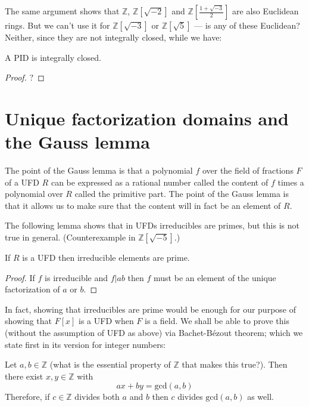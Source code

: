 \noindent
The same argument shows that
$\mathbb{Z}$,
$\mathbb{Z}[\sqrt{-2}]$ and
$\mathbb{Z}
\left[\frac{1+\sqrt{-3}}{2}\right]$
are also Euclidean rings.
But we can't use it for
$\mathbb{Z}[\sqrt{-3}]$
or $\mathbb{Z}[\sqrt{5}]$
--- is any of these Euclidean?
Neither, since they are not
integrally closed, while we have:

\begin{lemma}
\label{lemma-euclidan-is-ufd}
A PID is integrally closed.
\end{lemma}

\begin{proof}
?
\end{proof}
\section{Unique factorization domains and the
Gauss lemma}
\label{section-UFD}

The point of the Gauss lemma is that a
polynomial $f$ over the field of fractions
$F$ of a UFD $R$ can be expressed as a
rational number called the content of $f$
times a polynomial over $R$ called the
primitive part. The point of the Gauss
lemma is that it allows us to make sure that
the content will in fact be an
element of $R$.

\medskip\noindent
The following lemma shows that in UFDs
irreducibles are primes, but this is not
true in general. (Counterexample in
$\mathbb{Z}[\sqrt{-5}]$.)

\begin{lemma}
\label{lemma-irreducible-is-prime}
If $R$ is a UFD then irreducible elements are
prime.
\end{lemma}

\begin{proof}
If $f$ is irreducible and $f|ab$ then $f$
must be an element of the unique
factorization of $a$ or $b$.
\end{proof}

In fact, showing that irreducibles are prime
would be enough for our purpose of
showing that $F[x]$ is a UFD when $F$ is a
field. We shall be able to prove this
(without the assumption of UFD as above) via
Bachet-Bézout theorem; which we
state first in its version for integer
numbers:

\begin{theorem}
\label{theorem-Bachet-Bezout-for-integers}
\begin{reference}
\cite[Theorem 1.7]{MMST}
\end{reference}
Let $a,b \in \mathbb{Z}$ (what is the
essential property of $\mathbb{Z}$ that
makes this true?). Then
there exist $x,y \in \mathbb{Z}$ with
 $$
ax+by=\text{gcd}(a,b)
$$
Therefore, if $c \in \mathbb{Z}$ divides both
$a$ and $b$ then $c$ divides
$\text{gcd}(a,b)$ as well.
\end{theorem}

